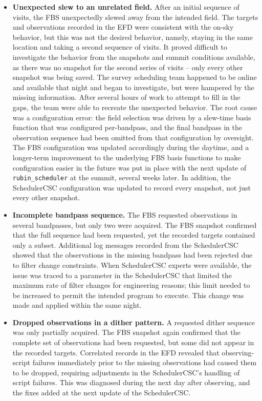 \begin{itemize}
  \item \textbf{Unexpected slew to an unrelated field.}
    After an initial sequence of visits, the FBS unexpectedly slewed away from the
    intended field. The targets and observations recorded in the EFD were
    consistent with the on-sky behavior, but this was not the 
    desired behavior, namely, staying in the same location and taking a second sequence
    of visits. It proved difficult to investigate the behavior
    from the snapshots and summit conditions available, as there was no
    snapshot for the second series of visits -- only every other snapshot was being 
    saved. The survey scheduling team happened to be online and available
   that night and began to investigate, but were hampered by the missing
    information. After several hours of work to attempt to fill in the gaps, the team were able
    to recreate the unexpected behavior. 
    The root cause was a configuration error: the field selection was
    driven by a slew-time basis function that was configured per-bandpass, and the
    final bandpass in the observation sequence had been omitted from that
    configuration by oversight. The FBS configuration was updated accordingly 
    during the daytime, and a longer-term improvement to the underlying FBS
    basis functions to make configuration easier in the future was put in place
    with the next update of \texttt{rubin\_scheduler} at the summit, several weeks later.
    In addition, the SchedulerCSC configuration was updated to record every snapshot,
    not just every other snapshot. 

  \item \textbf{Incomplete bandpass sequence.}
    The FBS requested observations in several bandpasses, but only two were
    acquired. The FBS snapshot confirmed that the full sequence had been
    requested, yet the recorded targets contained only a subset. Additional log
    messages recorded from the SchedulerCSC showed that the observations 
    in the missing bandpass had been rejected due to filter change constraints.
    When SchedulerCSC experts were available, the issue was traced to a 
    parameter in the SchedulerCSC that limited the maximum rate of
    filter changes for engineering reasons; this limit needed to be increased
    to permit the intended program to execute. This change was made and applied
    within the same night. 
    
  \item \textbf{Dropped observations in a dither pattern.}
    A requested dither sequence was only partially acquired. The FBS snapshot
    again confirmed that the complete set of observations had been requested, but
    some did not appear in the recorded targets. Correlated records in the EFD
    revealed that observing-script failures immediately prior to the missing
    observations had caused them to be dropped, requiring adjustments in the
    SchedulerCSC's handling of script failures. This was diagnosed during the 
    next day after observing, and the fixes added at the next update of the SchedulerCSC.
\end{itemize}


